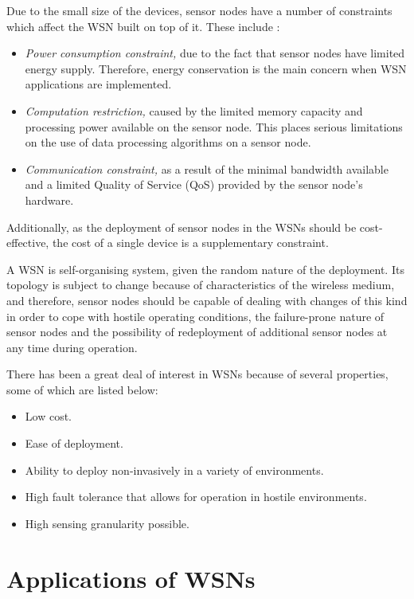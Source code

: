 Due to the small size of the devices, sensor nodes have a number of constraints
which affect the WSN built on top of it. These include \cite{yao:qps}:
\begin{itemize}
  \item \emph{Power consumption constraint,} due to the fact that sensor nodes
  have limited energy supply. Therefore, energy conservation is the main concern when
  WSN applications are implemented.
  \item \emph{Computation restriction,} caused by the limited memory
  capacity and processing power available on the sensor node. This places
  serious limitations on the use of data processing algorithms on a sensor node.
  
  \item \emph{Communication constraint,} as a result of the minimal bandwidth available and a
  limited Quality of Service (QoS) provided by the sensor node's hardware. 
\end{itemize}

Additionally, as the deployment of sensor nodes in the WSNs should be
cost-effective, the cost of a single device is a supplementary constraint.

A WSN is self-organising system, given the random nature of the deployment. Its
topology is subject to change because of characteristics of the wireless medium,
and therefore, sensor nodes should be capable of dealing with changes of this kind in order to cope with hostile operating
conditions, the failure-prone nature of sensor nodes and the possibility of
redeployment of additional sensor nodes at any time during operation.

There has been a great deal of interest in WSNs because of several
properties, some of which are listed below: 
\begin{itemize}
  \item Low cost.
  \item Ease of deployment.
  \item Ability to deploy non-invasively in a variety of environments.
  \item High fault tolerance that allows for operation in hostile environments.
  \item High sensing granularity possible.
\end{itemize}

\section{Applications of WSNs}

